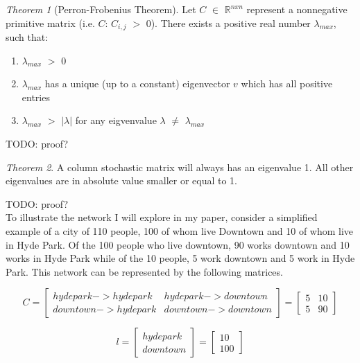 \documentclass{article}
\theoremstyle{definition}
\theoremstyle{remark}
\newtheorem{theorem}{Theorem}
\begin{document}
\theoremstyle{definition}
\begin{theorem}[Perron-Frobenius Theorem]
\label{Perron-Frobenius Theorem}
Let $C$ $\in$ $\mathbb{R}^{nxn}$ represent a nonnegative primitive matrix (i.e. $C$: $C_{i,j}$ $>$ 0).  There exists a positive real number $\lambda_{max}$, such that:
\begin{enumerate}
\item $\lambda_{max}$ $>$ 0
\item $\lambda_{max}$ has a unique (up to a constant) eigenvector $v$ which has all positive entries
\item $\lambda_{max}$ $>$ $|\lambda|$ for any eigvenvalue $\lambda$ $\neq$ $\lambda_{max}$
\end{enumerate}

\end{theorem}
TODO: proof?

\begin{theorem}
A column stochastic matrix will always has an eigenvalue 1. All other eigenvalues are in absolute
value smaller or equal to 1.
\end{theorem}
TODO: proof?
\\ 

To illustrate the network I will explore in my paper, consider a simplified example of a city of 110 people, 100 of whom live Downtown and 10 of whom live in Hyde Park.  Of the 100 people who live downtown, 90 works downtown and 10 works in Hyde Park while of the 10 people, 5 work downtown and 5 work in Hyde Park.  This network can be represented by the following matrices. 

\begin{equation}
      C
   =
  \begin{bmatrix}
    hyde park->hyde park  & hyde park->downtown\\
    downtown->hyde park  & downtown->downtown
    
  \end{bmatrix} = 
  \begin{bmatrix}
    5 & 10\\
    5 & 90 
  \end{bmatrix}
\end{equation}

\begin{equation}
      l
   =
  \begin{bmatrix}
    hyde park\\
    downtown
    
  \end{bmatrix} = 
  \begin{bmatrix}
    10\\
    100 
  \end{bmatrix}
\end{equation}
\end{document}
